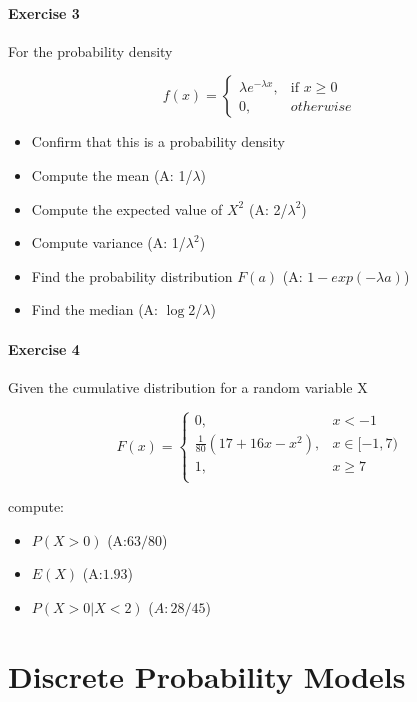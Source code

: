 \documentclass[
]{book}
\providecommand{\tightlist}{%
  \setlength{\itemsep}{0pt}\setlength{\parskip}{0pt}}
\begin{document}
\hypertarget{exercise-3-3}{%
\subsubsection{Exercise 3}\label{exercise-3-3}}

For the probability density

\[
    f(x)= 
\begin{cases}
    \lambda e^{-\lambda x},& \text{if } x \geq 0\\
    0,& otherwise 
\end{cases}
\]

\begin{itemize}
\tightlist
\item
  Confirm that this is a probability density
\item
  Compute the mean (A: 1/\(\lambda\))
\item
  Compute the expected value of \(X^2\) (A: 2/\(\lambda^2\))
\item
  Compute variance (A: 1/\(\lambda^2\))
\item
  Find the probability distribution \(F(a)\) (A: \(1-exp(-\lambda a)\))
\item
  Find the median (A: \(\log{2}\)/\(\lambda\))
\end{itemize}

\hypertarget{exercise-4-3}{%
\subsubsection{Exercise 4}\label{exercise-4-3}}

Given the cumulative distribution for a random variable X

\[
    F(x)= 
\begin{cases}
0, & x  < -1 \\
\frac{1}{80}(17+16x-x^2),& x \in [-1,7)\\
1,& x \geq 7\\
\end{cases}
\]

compute:

\begin{itemize}
\tightlist
\item
  \(P(X>0)\) (A:\(63/80\))
\item
  \(E(X)\) (A:\(1.93\))
\item
  \(P(X>0|X<2)\) (\(A:28/45\))
\end{itemize}

\hypertarget{discrete-probability-models}{%
\chapter{Discrete Probability Models}\label{discrete-probability-models}}
\end{document}
